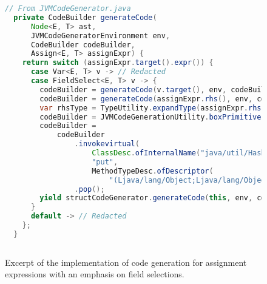 \begin{figure}[H]
  \centering
  \begin{lstlisting}[language=Java]
  // From JVMCodeGenerator.java
  private CodeBuilder generateCode(
      Node<E, T> ast,
      JVMCodeGeneratorEnvironment env,
      CodeBuilder codeBuilder,
      Assign<E, T> assignExpr) {
    return switch (assignExpr.target().expr()) {
      case Var<E, T> v -> // Redacted 
      case FieldSelect<E, T> v -> {
        codeBuilder = generateCode(v.target(), env, codeBuilder).ldc(v.field());
        codeBuilder = generateCode(assignExpr.rhs(), env, codeBuilder);
        var rhsType = TypeUtility.expandType(assignExpr.rhs().env(), assignExpr.rhs().type());
        codeBuilder = JVMCodeGenerationUtility.boxPrimitive(codeBuilder, rhsType);
        codeBuilder =
            codeBuilder
                .invokevirtual(
                    ClassDesc.ofInternalName("java/util/HashMap"),
                    "put",
                    MethodTypeDesc.ofDescriptor(
                        "(Ljava/lang/Object;Ljava/lang/Object;)Ljava/lang/Object;"))
                .pop();
        yield structCodeGenerator.generateCode(this, env, codeBuilder, ast, v);
      }
      default -> // Redacted
    };
  }
   
  \end{lstlisting}
  \caption{Excerpt of the implementation of code generation for assignment expressions with an emphasis on field selections.}
  \label{fig:jvm_field_assignment}
\end{figure}
